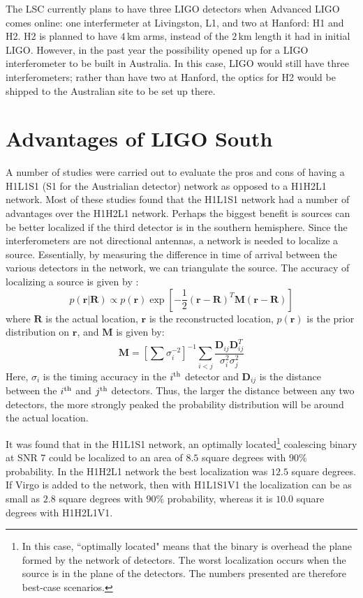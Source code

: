 
The \ac{LSC} currently plans to have three \ac{LIGO} detectors when Advanced
LIGO comes online: one interfermeter at Livingston, L1, and two at Hanford: H1
and H2. H2 is planned to have $4\,$km arms, instead of the $2\,$km length it
had in initial LIGO. However, in the past year the possibility opened up for a
\ac{LIGO} interferometer to be built in Australia. In this case, LIGO would
still have three interferometers; rather than have two at Hanford, the optics
for H2 would be shipped to the Australian site to be set up there.

\section{Advantages of LIGO South}

A number of studies were carried out to evaluate the pros and cons of having a
H1L1S1 (S1 for the Austrialian detector) network as opposed to a H1H2L1
network. Most of these studies found that the H1L1S1 network had a number of
advantages over the H1H2L1 network. Perhaps the biggest benefit is sources can
be better localized if the third detector is in the southern hemisphere. Since
the interferometers are not directional antennas, a network is needed to
localize a source. Essentially, by measuring the difference in time of arrival
between the various detectors in the network, we can triangulate the source.
The accuracy of localizing a source is given by \cite{Fairhurst2009,
wiki:ligoSth:localization}:
\begin{equation*}
p(\mathbf{r}|\mathbf{R}) \propto p(\mathbf{r})\exp\left[ -\frac{1}{2}(\mathbf{r} - \mathbf{R})^T \mathbf{M}(\mathbf{r}-\mathbf{R})\right]
\end{equation*}
where $\mathbf{R}$ is the actual location, $\mathbf{r}$ is the reconstructed location, $p(\mathbf{r})$ is the prior distribution on $\mathbf{r}$, and $\mathbf{M}$ is given by:
\begin{equation*}
\mathbf{M} = \left[\sum \sigma_i^{-2}\right]^{-1} \sum_{i<j} \frac{\mathbf{D}_{ij}\mathbf{D}^T_{ij}}{\sigma^2_i \sigma^2_j}
\end{equation*}
Here, $\sigma_i$ is the timing accuracy in the $i^{\mathrm{th}}$ detector and
$\mathbf{D}_{ij}$ is the distance between the $i^{\mathrm{th}}$ and $j^{\mathrm{th}}$ detectors.
Thus, the larger the distance between any two detectors, the more strongly
peaked the probability distribution will be around the actual location.

It was found \cite{wiki:ligoSth:localization} that in the H1L1S1 network, an
optimally located\footnote{In this case, ``optimally located" means that the
binary is overhead the plane formed by the network of detectors. The worst
localization occurs when the source is in the plane of the detectors. The
numbers presented are therefore best-case scenarios.} coalescing binary at \ac{SNR} 7
could be localized to an area of $8.5$ square degrees with $90\%$ probability.
In the H1H2L1 network the best localization was $12.5$ square degrees. If Virgo
is added to the network, then with H1L1S1V1 the localization can be as small as
$2.8$ square degrees with $90\%$ probability, whereas it is $10.0$ square
degrees with H1H2L1V1.

